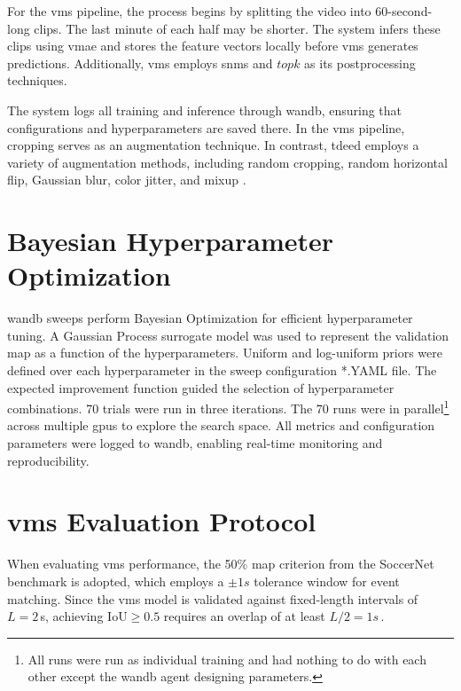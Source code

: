 For the \acrshort{vms} pipeline, the process begins by splitting the video into 60-second-long clips. The last minute of each half may be shorter. The system infers these clips using \acrshort{vmae} and stores the feature vectors locally before \acrshort{vms} generates predictions. Additionally, \acrshort{vms} employs \acrshort{snms} and $topk$ as its postprocessing techniques.

The system logs all training and inference through \acrfull{wandb}, ensuring that configurations and hyperparameters are saved there. In the \acrshort{vms} pipeline, cropping serves as an augmentation technique. In contrast, \acrshort{tdeed} employs a variety of augmentation methods, including random cropping, random horizontal flip, Gaussian blur, color jitter, and mixup \cite{xarles_t-deed_2024}.

\section{Bayesian Hyperparameter Optimization}
\label{sec:bayesian_optimization}

\acrshort{wandb} sweeps perform Bayesian Optimization for efficient hyperparameter tuning. A Gaussian Process surrogate model was used to represent the validation \acrshort{map} as a function of the hyperparameters. Uniform and log-uniform priors were defined over each hyperparameter in the sweep configuration *.YAML file. The expected improvement function guided the selection of hyperparameter combinations. 70 trials were run in three iterations. The 70 runs were in parallel\footnote{All runs were run as individual training and had nothing to do with each other except the \acrshort{wandb} agent designing parameters.} across multiple \acrshort{gpu}s to explore the search space. All metrics and configuration parameters were logged to \acrshort{wandb}, enabling real-time monitoring and reproducibility. 


\section{\acrshort{vms} Evaluation Protocol}
\label{sec:eval_protocol}

When evaluating \acrshort{vms} performance, the 50\% \acrshort{map} criterion from the SoccerNet benchmark is adopted, which employs a $\pm1s$ tolerance window for event matching. Since the \acrshort{vms} model is validated against fixed‐length intervals of $L = 2\,$s, achieving $\mathrm{IoU}\ge0.5$ requires an overlap of at least $L/2 = 1s\,$.

